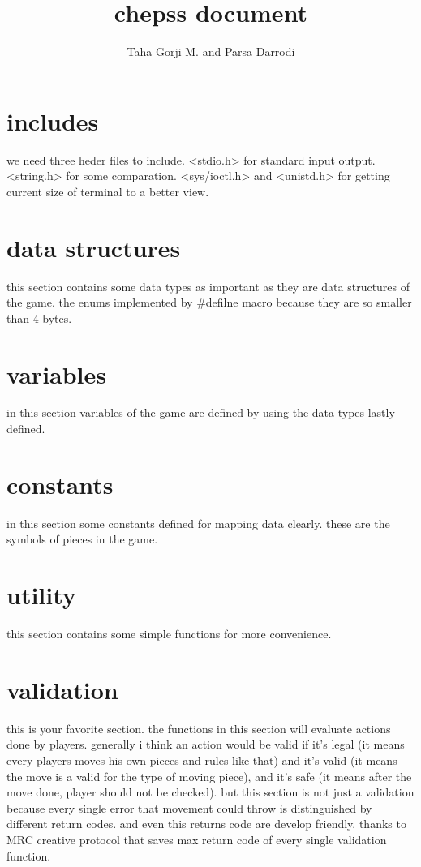 \documentclass[11pt]{article} %
\title{chepss document}
\author{Taha Gorji M. and Parsa Darrodi}
\begin{document}
\maketitle


\section{includes}
we need three heder files to include.
<stdio.h> for standard input output. <string.h> for some comparation. <sys/ioctl.h> and <unistd.h> for getting current size of terminal to a better view. 


\section{data structures}
this section contains some data types as important as they are data structures of the game. the enums implemented by \#defilne macro because they are so smaller than 4 bytes.


\section{variables}
in this section variables of the game are defined by using the data types lastly defined.


\section{constants}
in this section some constants defined for mapping data clearly. these are the symbols of pieces in the game.


\section{utility}
this section contains some simple functions for more convenience.


\section{validation}
this is your favorite section. the functions in this section will evaluate actions done by players. generally i think an action would be valid if it's legal (it means every players moves his own pieces and rules like that) and it's valid (it means the move is a valid for the type of moving piece), and it's safe (it means after the move done, player should not be checked).
but this section is not just a validation because every single error that movement could throw is distinguished by different return codes. and even this returns code are develop friendly. thanks to MRC creative protocol that saves max return code of every single validation function.
\end{document}
